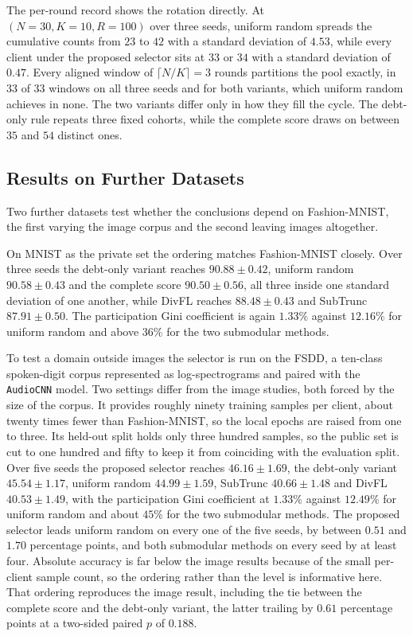 \documentclass[journal]{IEEEtran}
\newcommand{\rev}[1]{{\color{blue}#1}}
\begin{document}
\rev{The per-round record shows the rotation directly. At $(N = 30, K = 10, R = 100)$ over three seeds, uniform random spreads the cumulative counts from $23$ to $42$ with a standard deviation of $4.53$, while every client under the proposed selector sits at $33$ or $34$ with a standard deviation of $0.47$. Every aligned window of $\lceil N/K \rceil = 3$ rounds partitions the pool exactly, in $33$ of $33$ windows on all three seeds and for both variants, which uniform random achieves in none. The two variants differ only in how they fill the cycle. The debt-only rule repeats three fixed cohorts, while the complete score draws on between $35$ and $54$ distinct ones.}

\subsection{Results on Further Datasets}
\label{ssec:exp-cross-dataset}

\rev{Two further datasets test whether the conclusions depend on Fashion-MNIST, the first varying the image corpus and the second leaving images altogether.}

\rev{On MNIST as the private set the ordering matches Fashion-MNIST closely. Over three seeds the debt-only variant reaches $90.88 \pm 0.42$, uniform random $90.58 \pm 0.43$ and the complete score $90.50 \pm 0.56$, all three inside one standard deviation of one another, while DivFL reaches $88.48 \pm 0.43$ and SubTrunc $87.91 \pm 0.50$. The participation Gini coefficient is again $1.33\%$ against $12.16\%$ for uniform random and above $36\%$ for the two submodular methods.}

\rev{To test a domain outside images the selector is run on the FSDD, a ten-class spoken-digit corpus represented as log-spectrograms and paired with the \texttt{AudioCNN} model. Two settings differ from the image studies, both forced by the size of the corpus. It provides roughly ninety training samples per client, about twenty times fewer than Fashion-MNIST, so the local epochs are raised from one to three. Its held-out split holds only three hundred samples, so the public set is cut to one hundred and fifty to keep it from coinciding with the evaluation split. Over five seeds the proposed selector reaches $46.16 \pm 1.69$, the debt-only variant $45.54 \pm 1.17$, uniform random $44.99 \pm 1.59$, SubTrunc $40.66 \pm 1.48$ and DivFL $40.53 \pm 1.49$, with the participation Gini coefficient at $1.33\%$ against $12.49\%$ for uniform random and about $45\%$ for the two submodular methods. The proposed selector leads uniform random on every one of the five seeds, by between $0.51$ and $1.70$ percentage points, and both submodular methods on every seed by at least four. Absolute accuracy is far below the image results because of the small per-client sample count, so the ordering rather than the level is informative here. That ordering reproduces the image result, including the tie between the complete score and the debt-only variant, the latter trailing by $0.61$ percentage points at a two-sided paired $p$ of $0.188$.}
\end{document}
